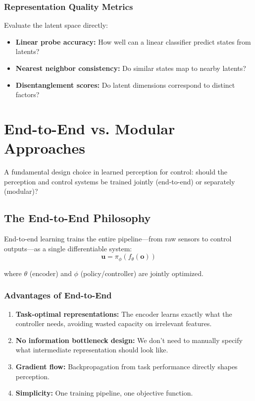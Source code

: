 \subsubsection{Representation Quality Metrics}

Evaluate the latent space directly:
\begin{itemize}
    \item \textbf{Linear probe accuracy:} How well can a linear classifier predict states from latents?
    \item \textbf{Nearest neighbor consistency:} Do similar states map to nearby latents?
    \item \textbf{Disentanglement scores:} Do latent dimensions correspond to distinct factors?
\end{itemize}

\section{End-to-End vs. Modular Approaches}
\label{sec:end_to_end_vs_modular}

A fundamental design choice in learned perception for control: should the perception and control systems be trained jointly (end-to-end) or separately (modular)?

\subsection{The End-to-End Philosophy}

End-to-end learning trains the entire pipeline---from raw sensors to control outputs---as a single differentiable system:
\begin{equation}
\mathbf{u} = \pi_\phi(f_\theta(\mathbf{o}))
\label{eq:end_to_end}
\end{equation}

where $\theta$ (encoder) and $\phi$ (policy/controller) are jointly optimized.

\subsubsection{Advantages of End-to-End}

\begin{enumerate}
    \item \textbf{Task-optimal representations:} The encoder learns exactly what the controller needs, avoiding wasted capacity on irrelevant features.

    \item \textbf{No information bottleneck design:} We don't need to manually specify what intermediate representation should look like.

    \item \textbf{Gradient flow:} Backpropagation from task performance directly shapes perception.

    \item \textbf{Simplicity:} One training pipeline, one objective function.
\end{enumerate}

